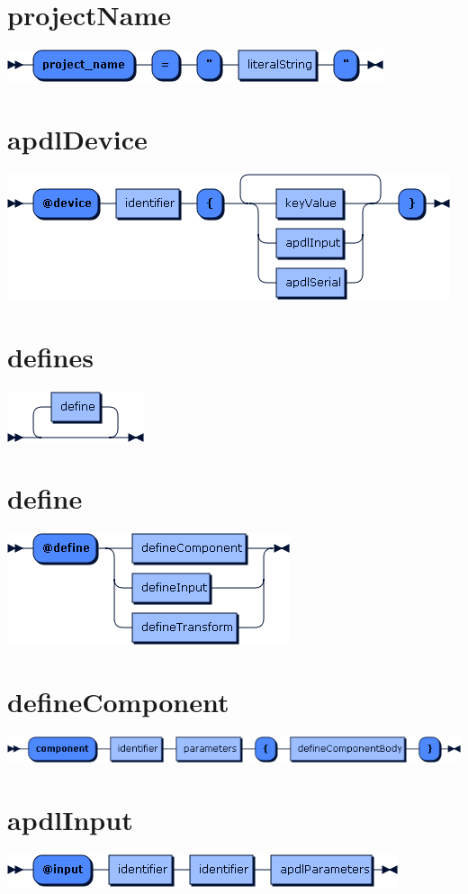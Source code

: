 \begin{appendices}
\section*{projectName}\includegraphics[scale=0.7]{img/ebnf_grammar/projectName}
\section*{apdlDevice}\includegraphics[scale=0.7]{img/ebnf_grammar/apdlDevice}
\section*{defines}\includegraphics[scale=0.7]{img/ebnf_grammar/defines}
\section*{define}\includegraphics[scale=0.7]{img/ebnf_grammar/define}
\section*{defineComponent}\includegraphics[scale=0.7]{img/ebnf_grammar/defineComponent}

\section*{apdlInput}\includegraphics[scale=0.7]{img/ebnf_grammar/apdlInput}

\end{appendices}
